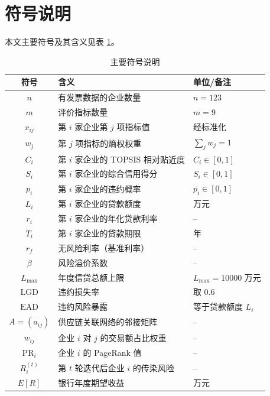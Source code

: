 \documentclass[12pt]{ctexart}
\begin{document}
\section{符号说明}

本文主要符号及其含义见表 \ref{tab:symbol}。

\begin{table}[H]
\centering
\caption{主要符号说明}
\label{tab:symbol}
\small
\begin{tabular}{cll}
\toprule
\textbf{符号} & \textbf{含义} & \textbf{单位/备注} \\
\midrule
$n$ & 有发票数据的企业数量 & $n=123$ \\
$m$ & 评价指标数量 & $m=9$ \\
$x_{ij}$ & 第 $i$ 家企业第 $j$ 项指标值 & 经标准化 \\
$w_j$ & 第 $j$ 项指标的熵权权重 & $\sum_j w_j=1$ \\
$C_i$ & 第 $i$ 家企业的 TOPSIS 相对贴近度 & $C_i\in[0,1]$ \\
$S_i$ & 第 $i$ 家企业的综合信用得分 & $S_i\in[0,1]$ \\
$p_i$ & 第 $i$ 家企业的违约概率 & $p_i\in[0,1]$ \\
$L_i$ & 第 $i$ 家企业的贷款额度 & 万元 \\
$r_i$ & 第 $i$ 家企业的年化贷款利率 & -- \\
$T_i$ & 第 $i$ 家企业的贷款期限 & 年 \\
$r_f$ & 无风险利率（基准利率） & -- \\
$\beta$ & 风险溢价系数 & -- \\
$L_{\max}$ & 年度信贷总额上限 & $L_{\max}=10000$ 万元 \\
$\mathrm{LGD}$ & 违约损失率 & 取 0.6 \\
$\mathrm{EAD}$ & 违约风险暴露 & 等于贷款额度 $L_i$ \\
$A=(a_{ij})$ & 供应链关联网络的邻接矩阵 & -- \\
$w_{ij}$ & 企业 $i$ 对 $j$ 的交易额占比权重 & -- \\
$\mathrm{PR}_i$ & 企业 $i$ 的 PageRank 值 & -- \\
$R_i^{(t)}$ & 第 $t$ 轮迭代后企业 $i$ 的传染风险 & -- \\
$E[R]$ & 银行年度期望收益 & 万元 \\
\bottomrule
\end{tabular}
\end{table}
\end{document}
